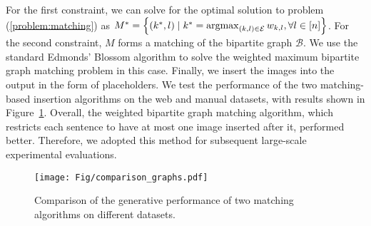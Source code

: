 For the first constraint, we can solve for the optimal solution to problem (\ref{problem:matching}) as $M^* = \left\{(k^*, l) \mid k^* = \operatornamewithlimits{argmax}_{(k,l) \in \mathcal{E}} w_{k,l}, \forall l \in [n] \right\}$. For the second constraint, $M$ forms a matching of the bipartite graph $\mathcal{B}$. We use the standard Edmonds' Blossom algorithm \citep{Edmonds_1965} to solve the weighted maximum bipartite graph matching problem in this case. Finally, we insert the images into the output in the form of placeholders. We test the performance of the two matching-based insertion algorithms on the web and manual datasets, with results shown in Figure~\ref{fig:enter-label}.
Overall, the weighted bipartite graph matching algorithm, which restricts each sentence to have at most one image inserted after it, performed better. Therefore, we adopted this method for subsequent large-scale experimental evaluations.


\begin{figure}
    \centering
\texttt{[image: Fig/comparison\_graphs.pdf]}
    \caption{Comparison of the generative performance of two matching algorithms on different datasets.}
    \label{fig:enter-label}
\end{figure}